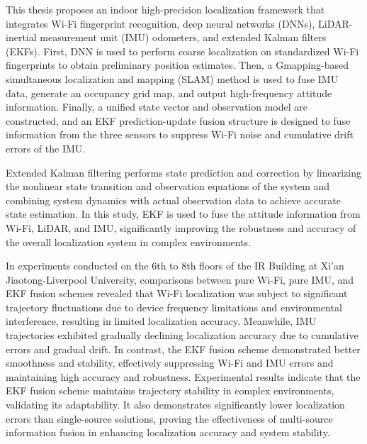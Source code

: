 \documentclass[12pt,a4paper]{article}
\numberwithin{equation}{section}
\begin{document}
This thesis proposes an indoor high-precision localization framework that
integrates Wi-Fi fingerprint recognition, deep neural networks (DNNs),
LiDAR-inertial measurement unit (IMU) odometers, and extended Kalman filters
(EKFs). First, DNN is used to perform coarse localization on standardized Wi-Fi
fingerprints to obtain preliminary position estimates. Then, a Gmapping-based
simultaneous localization and mapping (SLAM) method is used to fuse IMU data,
generate an occupancy grid map, and output high-frequency attitude
information. Finally, a unified state vector and observation model are
constructed, and an EKF prediction-update fusion structure is designed to fuse
information from the three sensors to suppress Wi-Fi noise and cumulative drift
errors of the IMU.

  
 

Extended Kalman filtering performs state prediction and correction by
linearizing the nonlinear state transition and observation equations of the
system and combining system dynamics with actual observation data to achieve
accurate state estimation. In this study, EKF is used to fuse the attitude
information from Wi-Fi, LiDAR, and IMU, significantly improving the robustness
and accuracy of the overall localization system in complex environments.

In experiments conducted on the 6th to 8th floors of the IR Building at Xi'an
Jiaotong-Liverpool University, comparisons between pure Wi-Fi, pure IMU, and EKF
fusion schemes revealed that Wi-Fi localization was subject to significant
trajectory fluctuations due to device frequency limitations and environmental
interference, resulting in limited localization accuracy. Meanwhile, IMU
trajectories exhibited gradually declining localization accuracy due to
cumulative errors and gradual drift. In contrast, the EKF fusion scheme
demonstrated better smoothness and stability, effectively suppressing Wi-Fi and
IMU errors and maintaining high accuracy and robustness. Experimental results
indicate that the EKF fusion scheme maintains trajectory stability in complex
environments, validating its adaptability. It also demonstrates significantly
lower localization errors than single-source solutions, proving the
effectiveness of multi-source information fusion in enhancing localization
accuracy and system stability.
\end{document}
